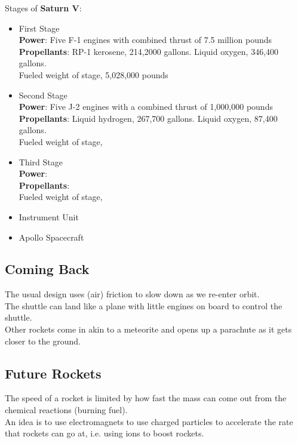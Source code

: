 \documentclass[12pt]{article}
\theoremstyle{definition}
\begin{document}
Stages of \textbf{Saturn V}:
\begin{itemize}
    \item First Stage \\
    \textbf{Power}: Five F-1 engines with combined thrust of 7.5 million pounds \\
    \textbf{Propellants}: RP-1 kerosene, 214,2000 gallons. Liquid oxygen, 346,400 gallons. \\
    Fueled weight of stage, 5,028,000 pounds

    \item Second Stage \\
    \textbf{Power}: Five J-2 engines with a combined thrust of 1,000,000 pounds \\
    \textbf{Propellants}: Liquid hydrogen, 267,700 gallons. Liquid oxygen, 87,400 gallons. \\
    Fueled weight of stage,

    \item Third Stage \\
    \textbf{Power}:  \\
    \textbf{Propellants}:  \\
    Fueled weight of stage,

    \item Instrument Unit

    \item Apollo Spacecraft
\end{itemize}

\subsection{Coming Back}
The usual design uses (air) friction to slow down as we re-enter orbit. \\
The shuttle can land like a plane with little engines on board to control the shuttle. \\
Other rockets come in akin to a meteorite and opens up a parachute as it gets closer to the ground.

\subsection{Future Rockets}
The speed of a rocket is limited by how fast the mass can come out from the chemical reactions (burning fuel). \\
An idea is to use electromagnets to use charged particles to accelerate the rate that rockets can go at, i.e. using ions to boost rockets.
\end{document}
